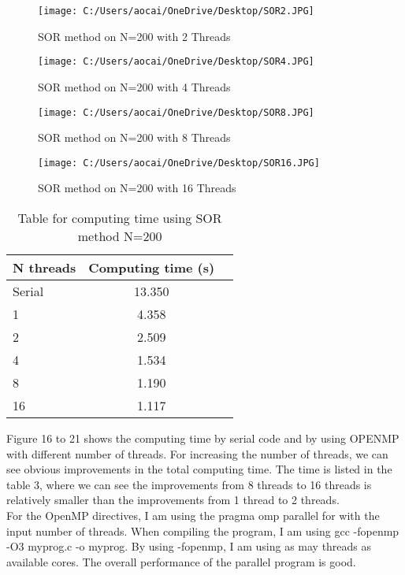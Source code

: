 \documentclass[12pt]{article}
\begin{document}
\begin{figure}[H]
	\centering
	\texttt{[image: C:/Users/aocai/OneDrive/Desktop/SOR2.JPG]}
	\caption[Optional caption]{SOR method on N=200 with 2 Threads}
	\label{fig:SOR2}
\end{figure}

\begin{figure}[H]
	\centering
	\texttt{[image: C:/Users/aocai/OneDrive/Desktop/SOR4.JPG]}
	\caption[Optional caption]{SOR method on N=200 with 4 Threads}
	\label{fig:SOR4}
\end{figure}

\begin{figure}[H]
	\centering
	\texttt{[image: C:/Users/aocai/OneDrive/Desktop/SOR8.JPG]}
	\caption[Optional caption]{SOR method on N=200 with 8 Threads}
	\label{fig:SOR8}
\end{figure}
\begin{figure}[H]
	\centering
	\texttt{[image: C:/Users/aocai/OneDrive/Desktop/SOR16.JPG]}
	\caption[Optional caption]{SOR method on N=200 with 16 Threads}
	\label{fig:SOR16}
\end{figure}

\begin{table}[H]
	\centering
	\label{tab:sor}
	\begin{tabular}{lcr}
	\bfseries N {threads} & Computing time (s)\\ \hline
	Serial & 13.350\\
	1 & 4.358\\
	2 & 2.509\\
	4 & 1.534\\
	8 & 1.190\\
	16 & 1.117\\
	\end{tabular}
	\caption[This is optional caption, without reference]{Table for computing time using SOR method N=200}
\end{table}
Figure 16 to 21 shows the computing time by serial code and by using OPENMP with different number of threads. For increasing the number of threads, we can see obvious improvements in the total computing time. The time is listed in the table 3, where we can see the improvements from 8 threads to 16 threads is relatively smaller than the improvements from 1 thread to 2 threads.\\

For the OpenMP directives, I am using the pragma omp parallel for with the input number of threads. When compiling the program, I am using gcc -fopenmp -O3 myprog.c -o myprog. By using -fopenmp, I am using as may threads as available cores. The overall performance of the parallel program is good.
\end{document}
